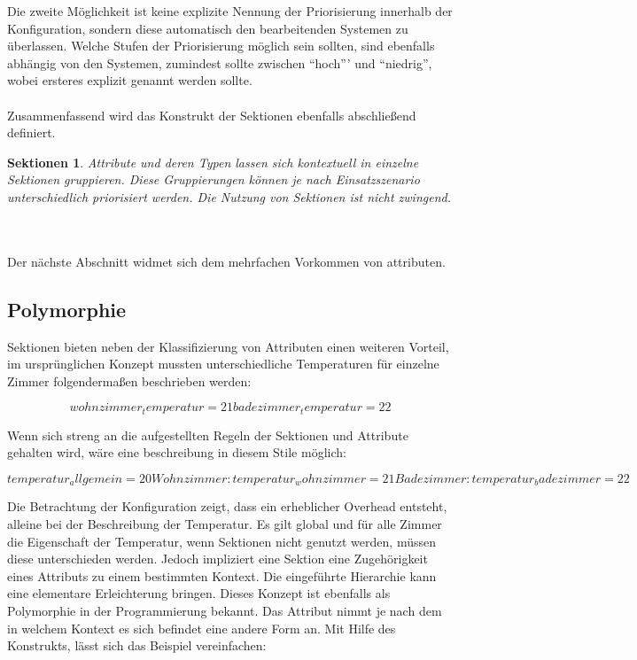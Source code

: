 Die zweite Möglichkeit ist keine explizite Nennung der Priorisierung innerhalb der Konfiguration, sondern diese automatisch den bearbeitenden Systemen zu überlassen. 
Welche Stufen der Priorisierung möglich sein sollten, sind ebenfalls abhängig von den Systemen, zumindest sollte zwischen "`hoch"'' und "`niedrig"', wobei ersteres explizit genannt werden sollte. 
\\\\
Zusammenfassend wird das Konstrukt der Sektionen ebenfalls abschließend definiert.
\newtheorem{mydef}{Sektionen}
\begin{mydef}
Attribute und deren Typen lassen sich kontextuell in einzelne Sektionen gruppieren. Diese Gruppierungen können je nach Einsatzszenario unterschiedlich priorisiert werden. Die Nutzung von Sektionen ist nicht zwingend.
\end{mydef}
\\\\
Der nächste Abschnitt widmet sich dem mehrfachen Vorkommen von attributen.

\subsection{Polymorphie}
Sektionen bieten neben der Klassifizierung von Attributen einen weiteren Vorteil, im ursprünglichen Konzept mussten unterschiedliche Temperaturen für einzelne Zimmer folgendermaßen beschrieben werden:

\begin{equation}
   	wohnzimmer_temperatur = 21
	badezimmer_temperatur = 22
\end{equation} 

Wenn sich streng an die aufgestellten Regeln der Sektionen und Attribute gehalten wird, wäre eine beschreibung in diesem Stile möglich: 


\begin{equation}
  temperatur_allgemein = 20
	
	Wohnzimmer: 
		temperatur_wohnzimmer = 21
	
	Badezimmer: 
		temperatur_badezimmer = 22

\end{equation} 
 
Die Betrachtung der Konfiguration zeigt, dass ein erheblicher Overhead entsteht, alleine bei der Beschreibung der Temperatur. Es gilt global und für alle Zimmer die Eigenschaft der Temperatur, wenn Sektionen nicht genutzt werden, müssen diese unterschieden werden. Jedoch impliziert eine Sektion eine Zugehörigkeit eines Attributs zu einem bestimmten Kontext. Die eingeführte Hierarchie kann eine elementare Erleichterung bringen. Dieses Konzept ist ebenfalls als Polymorphie in der Programmierung bekannt. Das Attribut nimmt je nach dem in welchem Kontext es sich befindet eine andere Form an. Mit Hilfe des Konstrukts, lässt sich das Beispiel vereinfachen: 

